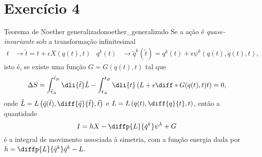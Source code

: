 \section*{Exercício 4}
\begin{theorem}{Teorema de Noether generalizado}{noether_generalizado}
    Se a ação é \emph{quase-invariante} sob a transformação infinitesimal
    \begin{align*}
        t &\to \tilde{t} = t + \epsilon X(q(t), t)&q^k(t) &\to \tilde{q}^k(\tilde{t}) = q^k(t) + \epsilon \psi^k(q(t), \dot{q}(t), t),
    \end{align*}
    isto é, se existe uma função \(G = G(q(t), t)\) tal que
    \begin{equation*}
        \Delta S = \int_{\tilde{t}_A}^{\tilde{t}_B} \dli{\tilde{t}} \tilde{L} - \int_{t_A}^{t_B} \dli{t} \left(L + \epsilon \diff*{G(q(t), t)}{t}\right) = 0,
    \end{equation*}
    onde \(\tilde{L} = L\left(\tilde{q}(\tilde{t}), \diff{\tilde{q}}{\tilde{t}}, \tilde{t}\right)\) e \(L = L\left(q(t), \diff{q}{t}, t\right)\), então a quantidade
    \begin{equation*}
        I = hX - \diffp{L}{\dot{q}^k}\psi^k + G
    \end{equation*}
    é a integral de movimento associada à simetria, com a função energia dada por \(h = \diffp{L}{\dot{q}^k}\dot{q}^k - L\).
\end{theorem}
